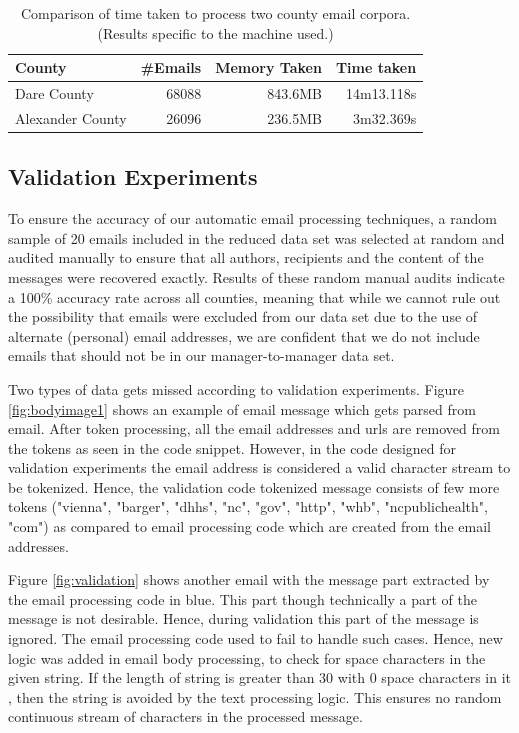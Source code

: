 \documentclass[fleqn]{MJDArticle}
\begin{document}
\begin{table}[ht]
\caption{\label{tab:time taken} Comparison of time taken to process two county email corpora.(Results specific to the machine used.) }
\centering
\begin{tabular}{lrrr}
  \hline
  \textbf{County} & \textbf{\#Emails} & \textbf{Memory Taken} & \textbf{Time taken} \\
  \hline
  Dare County & 68088 & 843.6MB &14m13.118s\\
  Alexander County & 26096 &  236.5MB &3m32.369s\\
  \hline
\end{tabular}
\end{table}
  

\subsection{Validation Experiments} 

To ensure the accuracy of our automatic email processing techniques, a random sample of 20 emails included in the reduced data set was selected at random and audited manually to ensure that all authors, recipients and the content of the messages were recovered exactly. Results of these random manual audits indicate a 100\% accuracy rate across all counties, meaning that while we cannot rule out the possibility that emails were excluded from our data set due to the use of alternate (personal) email addresses, we are confident that we do not include emails that should not be in our manager-to-manager data set.
\par
Two types of data gets missed according to validation experiments.  Figure \ref{fig:bodyimage1} shows an example of email message which gets parsed from email. After token processing, all the email addresses and urls are removed from the tokens as seen in the code snippet. However, in the code designed for validation experiments the email address is considered a valid character stream to be tokenized. Hence, the validation code tokenized message consists of few more tokens ("vienna", "barger", "dhhs", "nc", "gov", "http", "whb", "ncpublichealth", "com") as compared to email processing code which are created from the email addresses.

Figure \ref{fig:validation} shows another email with the message part extracted by the email processing code in blue. This part though technically a part of the message is not desirable. Hence, during validation this part of the message is ignored. The email  processing code used to fail to handle such cases. Hence, new logic was added in email body processing, to check for space characters in the given string. If the length of string is greater than 30 with 0  space characters in it , then the string is avoided by the text processing logic. This ensures no random continuous stream of characters in the processed message.
\end{document}

